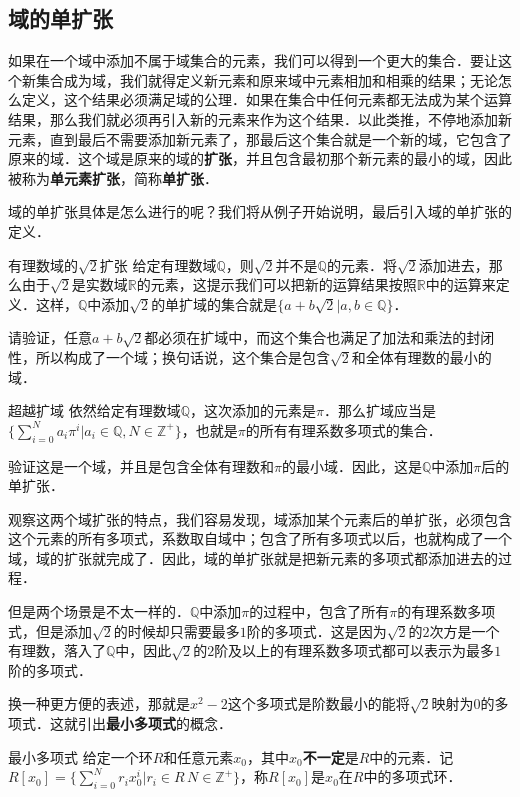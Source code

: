 

\subsection{域的单扩张}
如果在一个域中添加不属于域集合的元素，我们可以得到一个更大的集合．要让这个新集合成为域，我们就得定义新元素和原来域中元素相加和相乘的结果；无论怎么定义，这个结果必须满足域的公理．如果在集合中任何元素都无法成为某个运算结果，那么我们就必须再引入新的元素来作为这个结果．以此类推，不停地添加新元素，直到最后不需要添加新元素了，那最后这个集合就是一个新的域，它包含了原来的域．这个域是原来的域的\textbf{扩张}，并且包含最初那个新元素的最小的域，因此被称为\textbf{单元素扩张}，简称\textbf{单扩张}．

域的单扩张具体是怎么进行的呢？我们将从例子开始说明，最后引入域的单扩张的定义．

\begin{exercise}{有理数域的$\sqrt{2}$扩张}
给定有理数域$\mathbb{Q}$，则$\sqrt{2}$并不是$\mathbb{Q}$的元素．将$\sqrt{2}$添加进去，那么由于$\sqrt{2}$是实数域$\mathbb{R}$的元素，这提示我们可以把新的运算结果按照$\mathbb{R}$中的运算来定义．这样，$\mathbb{Q}$中添加$\sqrt{2}$的单扩域的集合就是$\{a+b\sqrt{2}|a, b\in\mathbb{Q}\}$．

请验证，任意$a+b\sqrt{2}$都必须在扩域中，而这个集合也满足了加法和乘法的封闭性，所以构成了一个域；换句话说，这个集合是包含$\sqrt{2}$和全体有理数的最小的域．
\end{exercise}

\begin{exercise}{超越扩域}
依然给定有理数域$\mathbb{Q}$，这次添加的元素是$\pi$．那么扩域应当是$\{\sum_{i=0}^N a_i\pi^i|a_i\in\mathbb{Q}, N\in\mathbb{Z}^+\}$，也就是$\pi$的所有有理系数多项式的集合．

验证这是一个域，并且是包含全体有理数和$\pi$的最小域．因此，这是$\mathbb{Q}$中添加$\pi$后的单扩张．
\end{exercise}

观察这两个域扩张的特点，我们容易发现，域添加某个元素后的单扩张，必须包含这个元素的所有多项式，系数取自域中；包含了所有多项式以后，也就构成了一个域，域的扩张就完成了．因此，域的单扩张就是把新元素的多项式都添加进去的过程．

但是两个场景是不太一样的．$\mathbb{Q}$中添加$\pi$的过程中，包含了所有$\pi$的有理系数多项式，但是添加$\sqrt{2}$的时候却只需要最多$1$阶的多项式．这是因为$\sqrt{2}$的$2$次方是一个有理数，落入了$\mathbb{Q}$中，因此$\sqrt{2}$的$2$阶及以上的有理系数多项式都可以表示为最多$1$阶的多项式．

换一种更方便的表述，那就是$x^2-2$这个多项式是阶数最小的能将$\sqrt{2}$映射为$0$的多项式．这就引出\textbf{最小多项式}的概念．

\begin{definition}{最小多项式}
给定一个环$R$和任意元素$x_0$，其中$x_0$\textbf{不一定}是$R$中的元素．记$R[x_0]=\{\sum_{i=0}^N r_ix_0^i|r_i\in R\, N\in\mathbb{Z}^+\}$，称$R[x_0]$是$x_0$在$R$中的多项式环．
\end{definition}

